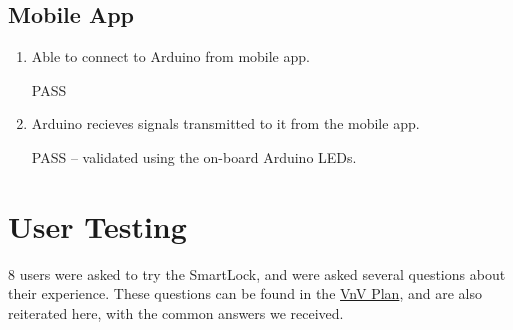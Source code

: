 \documentclass[12pt, titlepage]{article}
\begin{document}
\subsection{Mobile App}
\begin{enumerate}
    \item Able to connect to Arduino from mobile app.

    PASS
    \item Arduino recieves signals transmitted to it from the mobile app.

    PASS -- validated using the on-board Arduino LEDs.
\end{enumerate}

\section{User Testing}
\label{User Testing}

8 users were asked to try the SmartLock, and were asked several questions about their experience. These questions can be found in the \href{https://github.com/NevoAbigail/Capstone/blob/main/docs/VnVPlan/VnVPlan.pdf}{VnV Plan}, and are also reiterated here, with the common answers we received.
\end{document}
